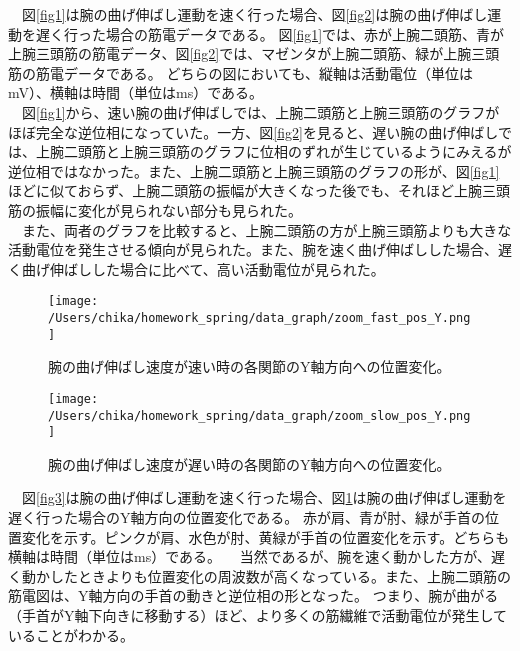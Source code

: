 \documentclass{jsarticle}
\begin{document}
　図\ref{fig1}は腕の曲げ伸ばし運動を速く行った場合、図\ref{fig2}は腕の曲げ伸ばし運動を遅く行った場合の筋電データである。
図\ref{fig1}では、赤が上腕二頭筋、青が上腕三頭筋の筋電データ、図\ref{fig2}では、マゼンタが上腕二頭筋、緑が上腕三頭筋の筋電データである。
どちらの図においても、縦軸は活動電位（単位はmV）、横軸は時間（単位はms）である。\\
　図\ref{fig1}から、速い腕の曲げ伸ばしでは、上腕二頭筋と上腕三頭筋のグラフがほぼ完全な逆位相になっていた。一方、図\ref{fig2}を見ると、遅い腕の曲げ伸ばしでは、上腕二頭筋と上腕三頭筋のグラフに位相のずれが生じているようにみえるが逆位相ではなかった。また、上腕二頭筋と上腕三頭筋のグラフの形が、図\ref{fig1}ほどに似ておらず、上腕二頭筋の振幅が大きくなった後でも、それほど上腕三頭筋の振幅に変化が見られない部分も見られた。\\
　また、両者のグラフを比較すると、上腕二頭筋の方が上腕三頭筋よりも大きな活動電位を発生させる傾向が見られた。また、腕を速く曲げ伸ばしした場合、遅く曲げ伸ばしした場合に比べて、高い活動電位が見られた。

\clearpage

\begin{figure}[!h]
\begin{center}
\begin{minipage}[t]{0.49\textwidth}
\centering
\texttt{[image: /Users/chika/homework\_spring/data\_graph/zoom\_fast\_pos\_Y.png]}
\caption{腕の曲げ伸ばし速度が速い時の各関節のY軸方向への位置変化。}
\label{fig3}
\end{minipage}
\hfill
\begin{minipage}[t]{0.49\textwidth}
\centering
\texttt{[image: /Users/chika/homework\_spring/data\_graph/zoom\_slow\_pos\_Y.png]}
\caption{腕の曲げ伸ばし速度が遅い時の各関節のY軸方向への位置変化。}
\label{fig4}
\end{minipage}
\end{center}
\end{figure}

　図\ref{fig3}は腕の曲げ伸ばし運動を速く行った場合、図\ref{fig4}は腕の曲げ伸ばし運動を遅く行った場合のY軸方向の位置変化である。
赤が肩、青が肘、緑が手首の位置変化を示す。ピンクが肩、水色が肘、黄緑が手首の位置変化を示す。どちらも横軸は時間（単位はms）である。
　当然であるが、腕を速く動かした方が、遅く動かしたときよりも位置変化の周波数が高くなっている。また、上腕二頭筋の筋電図は、Y軸方向の手首の動きと逆位相の形となった。
つまり、腕が曲がる（手首がY軸下向きに移動する）ほど、より多くの筋繊維で活動電位が発生していることがわかる。
\end{document}
